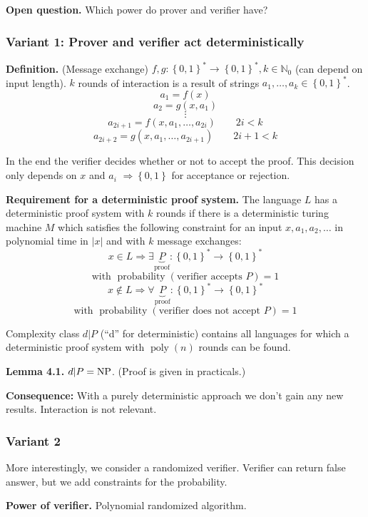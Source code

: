 \documentclass[a4paper]{article}
\newcommand{\cls}[1]{\rm{#1}}
\newcommand{\set}[1]{\left\{#1\right\}}
\DeclareMathOperator{\prop}{probability}
\begin{document}
\textbf{Open question.}
  Which power do prover and verifier have?

\subsubsection{Variant 1: Prover and verifier act deterministically}
%
\textbf{Definition.} (Message exchange)
  $f, g: \set{0,1}^* \rightarrow \set{0,1}^*, k \in \mathbb{N}_0$
  (can depend on input length). $k$ rounds of interaction is a
  result of strings $a_1, \ldots, a_k \in \set{0,1}^*$.
  \[
    a_1 = f(x)
  \] \[
    a_2 = g(x, a_1)
  \] \[
    \vdots
  \] \[
    a_{2i + 1} = f(x, a_1, \ldots, a_{2i}) \qquad 2i < k
  \] \[
    a_{2i + 2} = g(x, a_1, \ldots, a_{2i + 1}) \qquad 2i + 1 < k
  \]

In the end the verifier decides whether or not to accept the proof.
This decision only depends on $x$ and $a_i$ $\Rightarrow \set{0,1}$
for acceptance or rejection.

\textbf{Requirement for a deterministic proof system.}
The language $L$ has a deterministic proof system with $k$ rounds
if there is a deterministic turing machine $M$ which satisfies
the following constraint for an input $x, a_1, a_2, \ldots$ in
polynomial time in $|x|$ and with $k$ message exchanges:
\[
  x \in L \Rightarrow \exists \underbrace{P}_{\text{proof}}:
    \set{0,1}^* \rightarrow \set{0,1}^*
\] \[
  \text{with } \prop(\text{verifier accepts }P) = 1
\] \[
  x \notin L \Rightarrow \forall \underbrace{P}_{\text{proof}}:
    \set{0,1}^* \rightarrow \set{0,1}^*
\] \[
  \text{with } \prop(\text{verifier does not accept }P) = 1
\]

Complexity class $d | P$ (``d'' for deterministic) contains all
languages for which a deterministic proof system with
$\operatorname{poly}(n)$ rounds can be found.

\textbf{Lemma 4.1.} $d | P = \cls{NP}$. (Proof is given in practicals.)

\textbf{Consequence:}
With a purely deterministic approach we don't gain any new results.
Interaction is not relevant.

\subsubsection{Variant 2}
%
More interestingly, we consider a randomized verifier.
Verifier can return false answer, but we add constraints for the
probability.

\textbf{Power of verifier.}
  Polynomial randomized algorithm.
\end{document}
